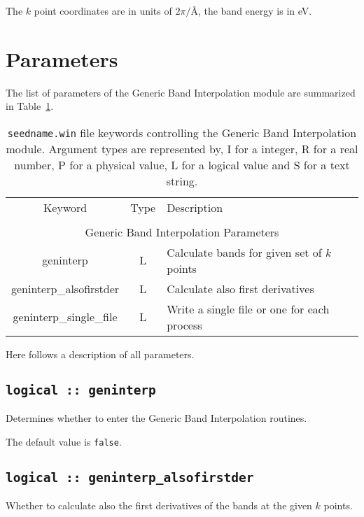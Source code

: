 The $k$ point coordinates are in units of $2\pi/$\AA, the band energy is in eV.

\section{Parameters}
The list of parameters of the Generic Band Interpolation module are summarized in Table~\ref{parameter_keywords_geninterp}. 

\begin{table}
\begin{center}
\begin{tabular}{|c|c|p{6cm}|}
\hline
Keyword & Type & Description \\
        &      &             \\
\hline\hline
\multicolumn{3}{|c|}{Generic Band Interpolation Parameters} \\
\hline
{\sc geninterp}   & L & Calculate bands for given set of $k$ points \\
{\sc geninterp\_alsofirstder} & L & Calculate also first derivatives\\ 
{\sc geninterp\_single\_file} & L & Write a single file or one for each
process\\ 
\hline
\end{tabular}
\caption[Parameter file keywords controlling the Generic Band Interpolation module.]
{{\tt seedname.win} file keywords controlling the Generic Band Interpolation module. Argument types
are represented by, I for a integer, R for a real number, P for a
physical value, L for a logical value and S for a text string.}
\label{parameter_keywords_geninterp}
\end{center}
\end{table}

Here follows a description of all parameters.

\subsection[boltzwann]{\tt logical :: geninterp}
Determines whether to enter the Generic Band Interpolation routines.

The default value is \verb#false#.

\subsection[geninterp\_alsofirstder]{\tt logical :: geninterp\_alsofirstder}
Whether to calculate also the first derivatives of the bands at the
given $k$ points.

